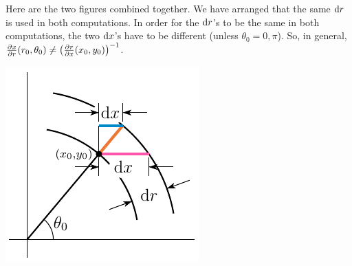 \begin{eg}
Here are the two figures combined together. We have arranged that the same
$\mathrm{d}r$ is used in both computations. In order for the $\mathrm{d}r$'s to 
be the same in both computations, the two $\mathrm{d}x$'s have to be different 
(unless $\theta_0=0,\pi$). So, in general, 
$\pdiff{x}{r}(r_0,\theta_0)\ne \big(\pdiff{r}{x}(x_0,y_0)\big)^{-1}$.
\begin{efig}
\begin{center}
   \includegraphics{dxdrdrdx3}
\end{center}
\end{efig}
\end{eg}

